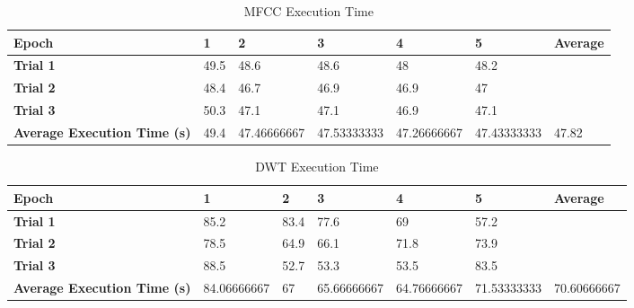 \begin{table}[!ht]
    \centering
    \caption{MFCC Execution Time}
    \begin{adjustbox}{width=\textwidth,keepaspectratio}
    \begin{tabular}{|l|l|l|l|l|l|l|}
    \hline
        \textbf{Epoch} & \textbf{1} & \textbf{2} & \textbf{3} & \textbf{4} & \textbf{5} & \textbf{Average} \\ \hline
        \textbf{Trial 1} & 49.5 & 48.6 & 48.6 & 48 & 48.2 & ~ \\ \hline
        \textbf{Trial 2} & 48.4 & 46.7 & 46.9 & 46.9 & 47 & ~ \\ \hline
        \textbf{Trial 3} & 50.3 & 47.1 & 47.1 & 46.9 & 47.1 & ~ \\ \hline
        \textbf{Average Execution Time (s)} & 49.4 & 47.46666667 & 47.53333333 & 47.26666667 & 47.43333333 & 47.82 \\ \hline
    \end{tabular}
    \end{adjustbox}
    \label{mfcc_time}
\end{table}

\begin{table}[!ht]
    \centering
    \caption{DWT Execution Time}
    \begin{adjustbox}{width=\textwidth,keepaspectratio}
    \begin{tabular}{|l|l|l|l|l|l|l|}
    \hline
        \textbf{Epoch} & \textbf{1} & \textbf{2} & \textbf{3} & \textbf{4} & \textbf{5} & \textbf{Average} \\ \hline
        \textbf{Trial 1} & 85.2 & 83.4 & 77.6 & 69 & 57.2 & ~ \\ \hline
        \textbf{Trial 2} & 78.5 & 64.9 & 66.1 & 71.8 & 73.9 & ~ \\ \hline
        \textbf{Trial 3} & 88.5 & 52.7 & 53.3 & 53.5 & 83.5 & ~ \\ \hline
        \textbf{Average Execution Time (s)} & 84.06666667 & 67 & 65.66666667 & 64.76666667 & 71.53333333 & 70.60666667 \\ \hline
    \end{tabular}
    \end{adjustbox}
    \label{dwt_time}
\end{table}